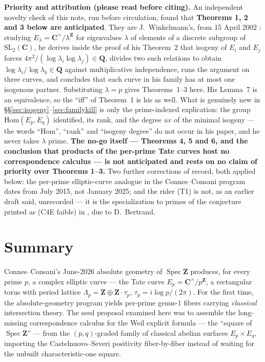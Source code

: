 \documentclass[11pt]{article}
\theoremstyle{definition}
\theoremstyle{remark}
\newcommand{\Z}{\mathbf{Z}}
\newcommand{\Q}{\mathbf{Q}}
\newcommand{\C}{\mathbf{C}}
\newcommand{\Hom}{\mathrm{Hom}}
\newcommand{\SpecZ}{\operatorname{Spec}\Z}
\begin{document}
\bigskip

\noindent\textbf{Priority and attribution (please read before citing).} An
independent novelty check of this note, run before circulation, found that
\textbf{Theorems 1, 2 and 3 below are anticipated}. They are J.~Winkelmann's,
from 15 April 2002 \cite{Wi04}: studying $E_\lambda = \C^\times/\lambda^{\Z}$
for eigenvalues $\lambda$ of elements of a discrete subgroup of
$\mathrm{SL}_2(\C)$, he derives inside the proof of his Theorem~2 that isogeny
of $E_i$ and $E_j$ forces $4\pi^2/(\log\lambda_i \log\lambda_j) \in \Q$,
divides two such relations to obtain $\log\lambda_i/\log\lambda_k \in \Q$
against multiplicative independence, runs the argument on three curves, and
concludes that each curve in his family has at most one isogenous partner.
Substituting $\lambda = p$ gives Theorems~1--3 here. His Lemma~7 is an
equivalence, so the ``iff'' of Theorem~1 is his as well. What is genuinely new
in \S\S\ref{sec:isogeny}--\ref{sec:familykill} is only the prime-indexed
explication: the group $\Hom(E_p, E_q)$ identified, its rank, and the degree
$uv$ of the minimal isogeny --- the words ``Hom'', ``rank'' and ``isogeny
degree'' do not occur in his paper, and he never takes $\lambda$ prime. \textbf{The
no-go itself --- Theorems 4, 5 and 6, and the conclusion that products of the
per-prime Tate curves host no correspondence calculus --- is not anticipated and
rests on no claim of priority over Theorems 1--3.} Two further corrections of
record, both applied below: the per-prime elliptic-curve analogue in the
Connes--Consani program dates from July 2015, not January 2025; and the rider
(T1) is not, as an earlier draft said, unrecorded --- it is the specialization
to primes of the conjecture printed as (C4E faible) in \cite[p.~231]{Dia97},
due to D.~Bertrand.

\setcounter{section}{-1}

\section{Summary}
\label{sec:summary}

Connes--Consani's June-2026 absolute geometry of $\SpecZ$ \cite{CC26}
produces, for every prime $p$, a complex elliptic curve --- the Tate curve
$E_p = \C^\times/p^{\Z}$, a rectangular torus with period lattice
$\Lambda_p = \Z \oplus \Z\cdot\tau_p$, $\tau_p = i\log p/(2\pi)$. For the
first time, the absolute-geometry program yields per-prime genus-$1$ fibers
carrying \emph{classical} intersection theory. The seed proposal examined
here was to assemble the long-missing correspondence calculus for the Weil
explicit formula --- the ``square of $\SpecZ$'' --- from the $(p,q)$-graded
family of classical abelian surfaces $E_p \times E_q$, importing the
Castelnuovo--Severi positivity fiber-by-fiber instead of waiting for the
unbuilt characteristic-one square.
\end{document}
